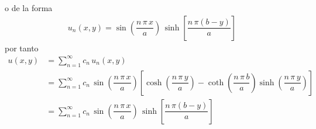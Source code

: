 o de la forma
\begin{align*}
u_{n} (x, y) = \sin \left( \dfrac{n \, \pi \, x}{a} \right) \, \sinh \left[ \dfrac{n \, \pi (b - y)}{a} \right]
\end{align*}
por tanto
\begin{align*}
u (x, y) &= \sum_{n=1}^{\infty} c_{n} \, u_{n} (x, y) \\
&= \sum_{n=1}^{\infty} c_{n} \, \sin \left( \dfrac{n \, \pi \, x}{a} \right) \left[  \cosh \left( \dfrac{n \, \pi \, y}{a} \right) - \coth \left( \dfrac{n \, \pi \, b}{a} \right) \sinh \left( \dfrac{n \, \pi \, y}{a} \right) \right] \\
&= \sum_{n=1}^{\infty} c_{n} \, \sin \left( \dfrac{n \, \pi \, x}{a} \right) \, \sinh \left[ \dfrac{n \, \pi (b - y)}{a} \right]
\end{align*}
